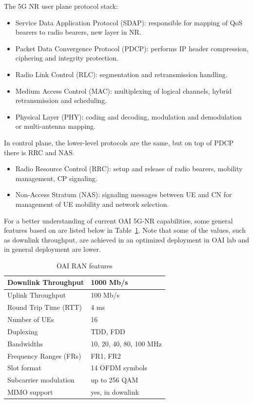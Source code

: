 \documentclass[12pt,a4paper,twoside]{report}
\begin{document}
The 5G NR user plane protocol stack:
\begin{itemize}
	\item Service Data Application Protocol (SDAP): responsible for mapping of QoS bearers to radio bearers, new layer in NR.
	\item Packet Data Convergence Protocol (PDCP): performs IP header compression, ciphering and integrity protection.
	\item Radio Link Control (RLC): segmentation and retransmission handling.
	\item Medium Access Control (MAC): multiplexing of logical channels, hybrid retransmission and scheduling.
	\item Physical Layer (PHY): coding and decoding, modulation and demodulation or multi-antenna mapping.
\end{itemize}
In control plane, the lower-level protocols are the same, but on top of PDCP there is RRC and NAS.
\begin{itemize}
	\item Radio Resource Control (RRC): setup and release of radio bearers, mobility management, CP signaling.
	\item Non-Access Stratum (NAS): signaling messages between UE and CN for management of UE mobility and network selection.
\end{itemize}
%
For a better understanding of current OAI 5G-NR capabilities, some general features based on \cite{oai_doc} are listed below in Table~\ref{T:OAI-featureset}. Note that some of the values, such as downlink throughput, are achieved in an optimized deployment in OAI lab and in general deployment are lower.
%
\begin{table}[!ht]
    \centering
    \caption{OAI RAN features}
    \begin{tabular}{|l|l|}
    \hline
        Downlink Throughput & 1000 Mb/s \\ \hline
        Uplink Throughput & 100 Mb/s \\ \hline
        Round Trip Time (RTT) & 4 ms \\ \hline
        Number of UEs & 16 \\ \hline
        Duplexing & TDD, FDD \\ \hline
        Bandwidths & 10, 20, 40, 80, 100 MHz \\ \hline
        Frequency Ranges (FRs) & FR1, FR2 \\ \hline
        Slot format & 14 OFDM symbols \\ \hline
        Subcarrier modulation & up to 256 QAM \\ \hline
        MIMO support & yes, in downlink \\ \hline
    \end{tabular}
    \label{T:OAI-featureset}
\end{table}
\end{document}
